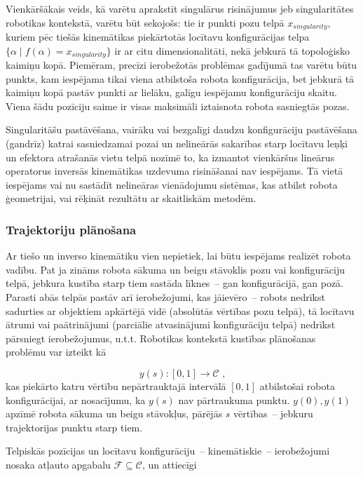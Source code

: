 \documentclass[12pt, a4paper]{article}
\numberwithin{equation}{section} %
\begin{document}
Vienkāršākais veids, kā varētu aprakstīt singulārus risinājumus jeb singularitātes robotikas kontekstā, varētu būt sekojošs: tie ir punkti pozu telpā $x_{singularity}$, kuriem pēc tiešās kinemātikas piekārtotās locītavu konfigurācijas telpa $\lbrace \alpha \mid f(\alpha) = x_{singularity} \rbrace$ ir ar citu dimensionalitāti, nekā jebkurā tā topoloģisko kaimiņu kopā. Piemēram, precīzi ierobežotās problēmas gadījumā tas varētu būtu punkts, kam iespējama tikai viena atbilstoša robota konfigurācija, bet jebkurā tā kaimiņu kopā pastāv punkti ar lielāku, galīgu iespējamu konfigurāciju skaitu. Viena šādu pozīciju saime ir visas maksimāli iztaisnota robota sasniegtās pozas.

Singularitāšu pastāvēšana, vairāku vai bezgalīgi daudzu konfigurāciju pastāvēšana (gandrīz) katrai sasniedzamai pozai un nelineārās sakarības starp locītavu leņķi un efektora atrašanās vietu telpā nozīmē to, ka izmantot vienkāršus lineārus operatorus inversās kinemātikas uzdevuma risināšanai nav iespējams. Tā vietā iespējams vai nu sastādīt nelineāras vienādojumu sistēmas, kas atbilst robota ģeometrijai, vai rēķināt rezultātu ar skaitliskām metodēm. 

\subsubsection{Trajektoriju plānošana}

Ar tiešo un inverso kinemātiku vien nepietiek, lai būtu iespējams realizēt robota vadību. Pat ja zināms robota sākuma un beigu stāvoklis pozu vai konfigurāciju telpā, jebkura kustība starp tiem sastāda līknes~-- gan konfigurācijā, gan pozā. Parasti abās telpās pastāv arī ierobežojumi, kas jāievēro~-- robots nedrīkst sadurties ar objektiem apkārtējā vidē (absolūtās vērtības pozu telpā), tā locītavu ātrumi vai paātrinājumi (parciālie atvasinājumi konfigurāciju telpā) nedrīkst pārsniegt ierobežojumus, u.t.t. Robotikas kontekstā kustības plānošanas problēmu var izteikt kā \cite{motion_planning_illinois}

\begin{equation}
    y(s): [0,1] \rightarrow \mathcal{C}
\text{ ,}
\end{equation}
kas piekārto katru vērtību nepārtrauktajā intervālā $[0,1]$ atbilstošai robota konfigurācijai, ar nosacījumu, ka $y(s)$ nav pārtraukuma punktu. $y(0), y(1)$ apzīmē robota sākuma un beigu stāvokļus, pārējās $s$ vērtības~-- jebkuru trajektorijas punktu starp tiem.

Telpiskās pozīcijas un locītavu konfigurāciju~-- kinemātiskie~-- ierobežojumi nosaka atļauto apgabalu $\mathcal{F} \subseteq \mathcal{C}$, un attiecīgi
\end{document}
